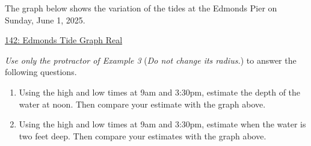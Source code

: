 \documentclass{ximera}
\begin{document}
\begin{example} \label{Ex:L3rdsfr43r}
The graph below shows the variation of the tides at the Edmonds Pier on Sunday, June 1, 2025.
\begin{onlineOnly}
    \begin{center}
\end{center}
\end{onlineOnly}

\href{https://www.desmos.com/calculator/5921617274}{142: Edmonds Tide Graph Real}

\emph{Use only the protractor of Example 3} (\emph{Do not change its radius.}) to answer the following questions.

\begin{enumerate}
\item Using the high and low times at 9am and 3:30pm, estimate the depth of the water at noon. Then compare your estimate with the graph above.

\item Using the high and low times at 9am and 3:30pm, estimate when the water is two feet deep. Then compare your estimates with the graph above.
\end{enumerate}



\end{example}
\end{document}
